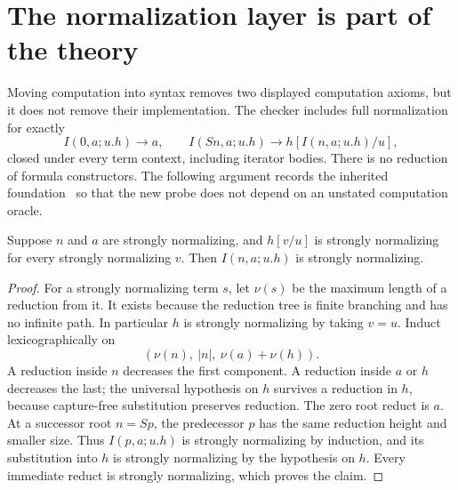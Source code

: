 \section{The normalization layer is part of the theory}
\label{sec:normalization}

Moving computation into syntax removes two displayed computation axioms,
but it does not remove their implementation. The checker includes full
normalization for exactly
\[
 I(0,a;u.h)\longrightarrow a,
 \qquad I(Sn,a;u.h)\longrightarrow h[I(n,a;u.h)/u],
\]
closed under every term context, including iterator bodies. There is no
reduction of formula constructors. The following argument records the
inherited foundation~\cite{normalization,witness} so that the new probe
does not depend on an unstated computation oracle.

\begin{lemma}
Suppose $n$ and $a$ are strongly normalizing, and $h[v/u]$ is strongly
normalizing for every strongly normalizing $v$. Then $I(n,a;u.h)$ is
strongly normalizing.
\end{lemma}
\begin{proof}
For a strongly normalizing term $s$, let $\nu(s)$ be the maximum length
of a reduction from it. It exists because the reduction tree is finite
branching and has no infinite path. In particular $h$ is strongly
normalizing by taking $v=u$. Induct lexicographically on
\[
 (\nu(n),\ |n|,\ \nu(a)+\nu(h)).
\]
A reduction inside $n$ decreases the first component. A reduction inside
$a$ or $h$ decreases the last; the universal hypothesis on $h$ survives a
reduction in $h$, because capture-free substitution preserves reduction.
The zero root reduct is $a$. At a successor root $n=Sp$, the predecessor
$p$ has the same reduction height and smaller size. Thus $I(p,a;u.h)$
is strongly normalizing by induction, and its substitution into $h$ is
strongly normalizing by the hypothesis on $h$. Every immediate reduct
is strongly normalizing, which proves the claim.
\end{proof}

